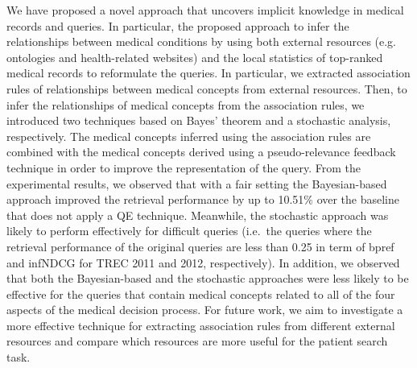 \documentclass[1p]{elsarticle}
\begin{document}
We have proposed a novel approach that uncovers implicit knowledge in medical records and queries. In particular, the proposed approach to infer the relationships between medical conditions by using both external resources (e.g. ontologies and health-related websites) and the local statistics of top-ranked medical records to reformulate the queries. 
In particular, we extracted association rules of relationships between medical concepts from external resources. Then, to infer the relationships of medical concepts from the association rules, we introduced two techniques based on Bayes' theorem and a stochastic analysis, respectively. The medical concepts inferred using the association rules are combined with the medical concepts derived using a pseudo-relevance feedback technique in order to improve the representation of the query.
From the experimental results, we observed that with a fair setting the Bayesian-based approach improved the retrieval performance by up to 10.51\% over the baseline that does not apply a QE technique. Meanwhile, the stochastic approach was likely to perform effectively for difficult queries (i.e.\ the queries where the retrieval performance of the original queries are less than 0.25 in term of bpref and infNDCG for TREC 2011 and 2012, respectively). In addition, we observed that both the Bayesian-based and the stochastic approaches were less likely to be effective for the queries that contain medical concepts related to all of the four aspects of the medical decision process. For future work, we aim to investigate a more effective technique for extracting association rules from different external resources and compare which resources are more useful for the patient search task.
\end{document}
